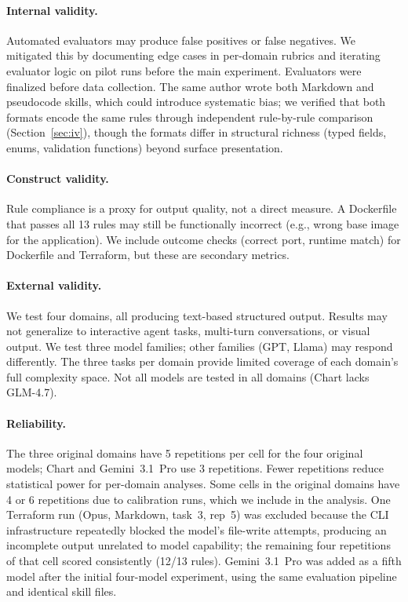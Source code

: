\documentclass[sigconf,nonacm]{acmart}
\begin{document}
\paragraph{Internal validity.}
Automated evaluators may produce false positives or false negatives. We
mitigated this by documenting edge cases in per-domain rubrics and iterating
evaluator logic on pilot runs before the main experiment. Evaluators were
finalized before data collection. The same author wrote both Markdown and
pseudocode skills, which could introduce systematic bias; we verified that both
formats encode the same rules through independent rule-by-rule comparison
(Section~\ref{sec:iv}), though the formats differ in structural richness
(typed fields, enums, validation functions) beyond surface presentation.

\paragraph{Construct validity.}
Rule compliance is a proxy for output quality, not a direct measure. A
Dockerfile that passes all 13 rules may still be functionally incorrect (e.g.,
wrong base image for the application). We include outcome checks (correct
port, runtime match) for Dockerfile and Terraform, but these are secondary
metrics.

\paragraph{External validity.}
We test four domains, all producing text-based structured output. Results may
not generalize to interactive agent tasks, multi-turn conversations, or visual
output. We test three model families; other families (GPT, Llama) may
respond differently. The three tasks per domain provide limited coverage of
each domain's full complexity space. Not all models are tested in all domains
(Chart lacks GLM-4.7).

\paragraph{Reliability.}
The three original domains have 5 repetitions per cell for the four original
models; Chart and Gemini~3.1~Pro use 3 repetitions. Fewer repetitions reduce
statistical power for per-domain analyses. Some cells in the original
domains have 4 or 6 repetitions due to calibration runs, which we include in
the analysis. One Terraform run (Opus, Markdown, task~3, rep~5) was excluded
because the CLI infrastructure repeatedly blocked the model's file-write
attempts, producing an incomplete output unrelated to model capability; the
remaining four repetitions of that cell scored consistently (12/13 rules).
Gemini~3.1~Pro was added as a fifth model after the initial four-model
experiment, using the same evaluation pipeline and identical skill files.
\end{document}

